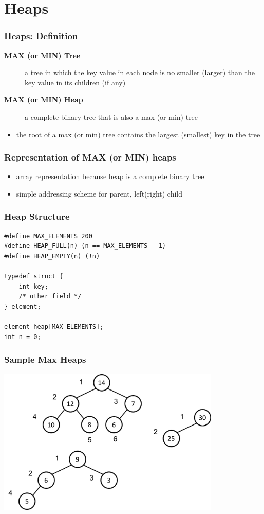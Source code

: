 \documentclass[newPxFont,sthlmFooter,nooffset]{beamer}
\begin{document}
\section{Heaps}
\begin{frame}[t]
  \frametitle{Heaps: Definition}
  \begin{description}
  \item[\textbf{MAX (or MIN) Tree}] a tree in which the key value in each node is no smaller (larger) than the key value in its children (if any)
  \item [\textbf{MAX (or MIN) Heap}] a complete binary tree that is also a max (or min) tree
  \end{description}
  \begin{itemize}
  \item the root of a max (or min) tree contains the largest (smallest) key in the tree
  \end{itemize}
\end{frame}


\begin{frame}[t]
  \frametitle{Representation of MAX (or MIN) heaps}
  \begin{itemize}
  \item array representation because heap is a complete binary tree

  \item simple addressing scheme for parent, left(right) child
  \end{itemize}

\end{frame}


\begin{frame}[t, fragile]
  \frametitle{Heap Structure}
  \begin{lstlisting}
#define MAX_ELEMENTS 200
#define HEAP_FULL(n) (n == MAX_ELEMENTS - 1) 
#define HEAP_EMPTY(n) (!n)

typedef struct {
    int key;
    /* other field */ 
} element;

element heap[MAX_ELEMENTS]; 
int n = 0;    
  \end{lstlisting}
\end{frame}


\begin{frame}[t]
  \frametitle{Sample Max Heaps}
  \begin{center}
    \includegraphics[width=0.8\textwidth]{figures/fig12_sample_heap.png}
  \end{center}

\end{frame}
\end{document}
